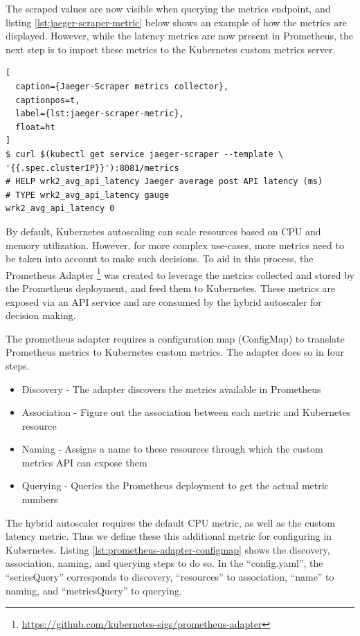 The scraped values are now visible when querying the metrics endpoint, and listing \ref{lst:jaeger-scraper-metric} below shows an example of how the metrics are displayed. However, while the latency metrics are now present in Prometheus, the next step is to import these metrics to the Kubernetes custom metrics server.\par

\begin{lstlisting}[
  caption={Jaeger-Scraper metrics collector},
  captionpos=t,
  label={lst:jaeger-scraper-metric},
  float=ht
]
$ curl $(kubectl get service jaeger-scraper --template \
'{{.spec.clusterIP}}'):8081/metrics
# HELP wrk2_avg_api_latency Jaeger average post API latency (ms)
# TYPE wrk2_avg_api_latency gauge
wrk2_avg_api_latency 0
\end{lstlisting}

By default, Kubernetes autoscaling can scale resources based on CPU and memory utilization. However, for more complex use-cases, more metrics need to be taken into account to make such decisions. To aid in this process, the Prometheus Adapter \footnote{\url{https://github.com/kubernetes-sigs/prometheus-adapter}} was created to leverage the metrics collected and stored by the Prometheus deployment, and feed them to Kubernetes. These metrics are exposed via an API service and are consumed by the hybrid autoscaler for decision making.\par

The prometheus adapter requires a configuration map (ConfigMap) to translate Prometheus metrics to Kubernetes custom metrics. The adapter does so in four steps.

\begin{itemize}
    \item Discovery - The adapter discovers the metrics available in Prometheus
    \item Association - Figure out the association between each metric and Kubernetes resource
    \item Naming - Assigns a name to these resources through which the custom metrics API can expose them
    \item Querying - Queries the Prometheus deployment to get the actual metric numbers
\end{itemize}

The hybrid autoscaler requires the default CPU metric, as well as the custom latency metric. Thus we define these this additional metric for configuring in Kubernetes. Listing \ref{lst:prometheus-adapter-configmap} shows the discovery, association, naming, and querying steps to do so. In the ``config.yaml'', the ``seriesQuery'' corresponds to discovery, ``resources'' to association, ``name'' to naming, and ``metricsQuery'' to querying.

